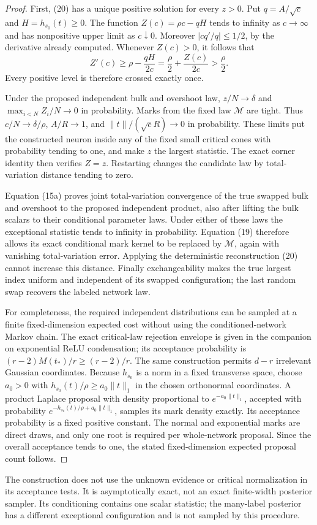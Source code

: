 \begin{proof}
First, (20) has a unique positive solution for every $z>0$.
Put $q=A/\sqrt c$ and $H=h_{s_0}(t)\ge0$. The function
$Z(c)=\rho c-qH$ tends to infinity as $c\to\infty$ and has
nonpositive upper limit as $c\downarrow0$. Moreover
$|cq'/q|\le1/2$, by the derivative already computed. Whenever
$Z(c)>0$, it follows that
\[
 Z'(c)\ge\rho-\frac{qH}{2c}
             =\frac\rho2+\frac{Z(c)}{2c}>\frac\rho2.
\]
Every positive level is therefore crossed exactly once.

Under the proposed independent bulk and overshoot law, $z/N\to\delta$
and $\max_{i<N}Z_i/N\to0$ in probability. Marks from the fixed law
$\mathcal M$ are tight. Thus $c/N\to\delta/\rho$, $A/R\to1$,
and $\|t\|/(\sqrt c R)\to0$ in probability. These limits put the
constructed neuron inside any of the fixed small critical cones with
probability tending to one, and make $z$ the largest statistic.
The exact corner identity then verifies $Z=z$. Restarting changes
the candidate law by total-variation distance tending to zero.

Equation (15a) proves joint total-variation convergence of the true
swapped bulk and overshoot to the proposed independent product, also
after lifting the bulk scalars to their conditional parameter laws.
Under either of these laws the exceptional statistic tends to infinity
in probability. Equation (19) therefore allows its exact conditional
mark kernel to be replaced by $\mathcal M$, again with vanishing
total-variation error. Applying the deterministic reconstruction (20)
cannot increase this distance. Finally exchangeability makes the true
largest index uniform and independent of its swapped configuration;
the last random swap recovers the labeled network law.

For completeness, the required independent distributions can be
sampled at a finite fixed-dimension expected cost without using the
conditioned-network Markov chain. The exact critical-law rejection
envelope is given in the companion on exponential ReLU condensation;
its acceptance probability is $(r-2)M(t_*)/r\ge(r-2)/r$.
The same construction permits $d-r$ irrelevant Gaussian coordinates.
Because $h_{s_0}$ is a norm in a fixed transverse space, choose
$a_0>0$ with $h_{s_0}(t)/\rho\ge a_0\|t\|_1$ in the chosen
orthonormal coordinates. A product Laplace proposal with density
proportional to $e^{-a_0\|t\|_1}$, accepted with probability
$e^{-h_{s_0}(t)/\rho+a_0\|t\|_1}$, samples its mark density exactly.
Its acceptance probability is a fixed positive constant. The normal
and exponential marks are direct draws, and only one root is required
per whole-network proposal. Since the overall acceptance tends to one,
the stated fixed-dimension expected proposal count follows.
\end{proof}

The construction does not use the unknown evidence or critical
normalization in its acceptance tests. It is asymptotically exact, not
an exact finite-width posterior sampler. Its conditioning contains one
scalar statistic; the many-label posterior has a different exceptional
configuration and is not sampled by this procedure.

